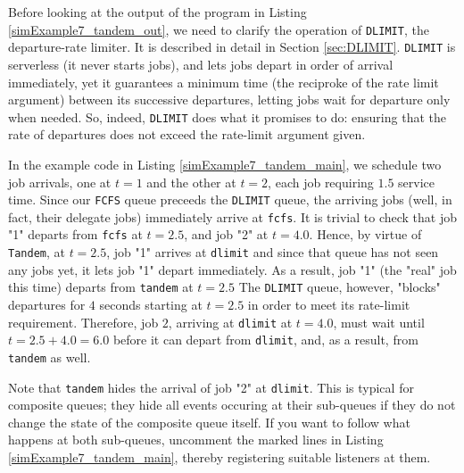 Before looking at the output of the program in
  Listing \ref{simExample7_tandem_out},
  we need to clarify the operation of \lstinline|DLIMIT|,
  the departure-rate limiter.
It is described in detail in Section \ref{sec:DLIMIT}.
\lstinline|DLIMIT| is serverless (it never starts jobs),
  and lets jobs depart in order of arrival immediately,
  yet it guarantees a minimum time (the reciproke of the rate limit argument)
  between its successive departures,
  letting jobs wait for departure only when needed.
So, indeed, \lstinline|DLIMIT| does what it promises to do:
  ensuring that the rate of departures does not exceed the
  rate-limit argument given.

In the example code in Listing \ref{simExample7_tandem_main},
  we schedule two job arrivals,
  one at $t=1$ and the other at $t=2$,
  each job requiring $1.5$ service time.
Since our \lstinline|FCFS| queue preceeds the \lstinline|DLIMIT|
  queue, the arriving jobs (well, in fact, their delegate jobs)
  immediately arrive at \lstinline|fcfs|.
It is trivial to check that job "1"
  departs from \lstinline|fcfs| at $t=2.5$,
  and job "2" at $t=4.0$.
Hence,
  by virtue of \lstinline|Tandem|,
  at $t=2.5$,
  job "1" arrives at \lstinline|dlimit|
  and since that queue has not seen any jobs yet,
  it lets job "1" depart immediately.
As a result,
  job "1" (the "real" job this time)
  departs from \lstinline|tandem| at $t=2.5$
The \lstinline|DLIMIT| queue, however,
  "blocks" departures for $4$ seconds
  starting at $t=2.5$
  in order to meet its rate-limit requirement.
Therefore, job $2$, arriving at \lstinline|dlimit|
  at $t=4.0$,
  must wait until $t=2.5+4.0=6.0$ before
  it can depart from \lstinline|dlimit|,
  and, as a result, from \lstinline|tandem| as well.

Note that \lstinline|tandem| hides
  the arrival of job "2" at \lstinline|dlimit|.
This is typical for composite queues;
  they hide all events occuring at their sub-queues
  if they do not change the state of the
  composite queue itself.
If you want to follow what happens at both
  sub-queues,
  uncomment the marked lines
  in Listing \ref{simExample7_tandem_main},
  thereby registering suitable listeners at them.

